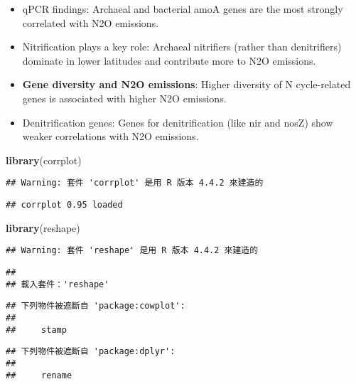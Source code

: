\documentclass[
]{article}
\newenvironment{Shaded}{\begin{snugshade}}{\end{snugshade}}
\newcommand{\FunctionTok}[1]{\textcolor[rgb]{0.13,0.29,0.53}{\textbf{#1}}}
\newcommand{\NormalTok}[1]{#1}
\providecommand{\tightlist}{%
  \setlength{\itemsep}{0pt}\setlength{\parskip}{0pt}}
\begin{document}
\begin{itemize}
\tightlist
\item
  qPCR findings: Archaeal and bacterial amoA genes are the most strongly
  correlated with N2O emissions.
\item
  Nitrification plays a key role: Archaeal nitrifiers (rather than
  denitrifiers) dominate in lower latitudes and contribute more to N2O
  emissions.
\item
  \textbf{Gene diversity and N2O emissions}: Higher diversity of N
  cycle-related genes is associated with higher N2O emissions.
\item
  Denitrification genes: Genes for denitrification (like nir and nosZ)
  show weaker correlations with N2O emissions.
\end{itemize}

\begin{Shaded}
\begin{Highlighting}[]
\FunctionTok{library}\NormalTok{(corrplot)}
\end{Highlighting}
\end{Shaded}

\begin{verbatim}
## Warning: 套件 'corrplot' 是用 R 版本 4.4.2 來建造的
\end{verbatim}

\begin{verbatim}
## corrplot 0.95 loaded
\end{verbatim}

\begin{Shaded}
\begin{Highlighting}[]
\FunctionTok{library}\NormalTok{(reshape)}
\end{Highlighting}
\end{Shaded}

\begin{verbatim}
## Warning: 套件 'reshape' 是用 R 版本 4.4.2 來建造的
\end{verbatim}

\begin{verbatim}
## 
## 載入套件：'reshape'
\end{verbatim}

\begin{verbatim}
## 下列物件被遮斷自 'package:cowplot':
## 
##     stamp
\end{verbatim}

\begin{verbatim}
## 下列物件被遮斷自 'package:dplyr':
## 
##     rename
\end{verbatim}
\end{document}
